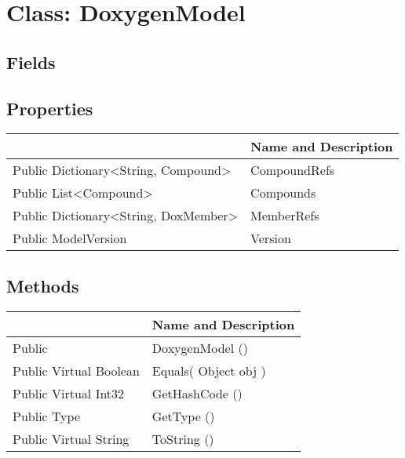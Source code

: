 \documentclass[11pt, oneside, a4paper]{book}
\begin{document}
\hypertarget{SoftwareEngineeringTools.{}Documentation.{}DoxygenModel}{}
\section{Class: DoxygenModel}

\subsection{Fields}

\subsection{Properties}
\begin{center}
\begin{tabular}{| p{3cm} | p{12cm} | }
\hline
\textbf{ } & \textbf{ Name and Description}\\
\hline
 Public  Dictionary<String, Compound> &  CompoundRefs\hypertarget{SoftwareEngineeringTools.{}Documentation.{}DoxygenModel.{}CompoundRefs}{}\\
\hline
 Public  List<Compound> &  Compounds\hypertarget{SoftwareEngineeringTools.{}Documentation.{}DoxygenModel.{}Compounds}{}\\
\hline
 Public  Dictionary<String, DoxMember> &  MemberRefs\hypertarget{SoftwareEngineeringTools.{}Documentation.{}DoxygenModel.{}MemberRefs}{}\\
\hline
 Public  ModelVersion &  Version\hypertarget{SoftwareEngineeringTools.{}Documentation.{}DoxygenModel.{}Version}{}\\
\hline
\end{tabular}
\end{center}

\subsection{Methods}
\begin{center}
\begin{tabular}{| p{3cm} | p{12cm} | }
\hline
\textbf{ } & \textbf{ Name and Description}\\
\hline
 Public  &  DoxygenModel ()\hypertarget{SoftwareEngineeringTools.{}Documentation.{}DoxygenModel.{}DoxygenModel}{}\\
\hline
 Public  Virtual  Boolean &  Equals(\hypertarget{SoftwareEngineeringTools.{}Documentation.{}DoxygenModel.{}Equals\_Object}{} Object  obj  )\\
\hline
 Public  Virtual  Int32 &  GetHashCode ()\hypertarget{SoftwareEngineeringTools.{}Documentation.{}DoxygenModel.{}GetHashCode}{}\\
\hline
 Public  Type &  GetType ()\hypertarget{SoftwareEngineeringTools.{}Documentation.{}DoxygenModel.{}GetType}{}\\
\hline
 Public  Virtual  String &  ToString ()\hypertarget{SoftwareEngineeringTools.{}Documentation.{}DoxygenModel.{}ToString}{}\\
\hline
\end{tabular}
\end{center}
 
\end{document}
